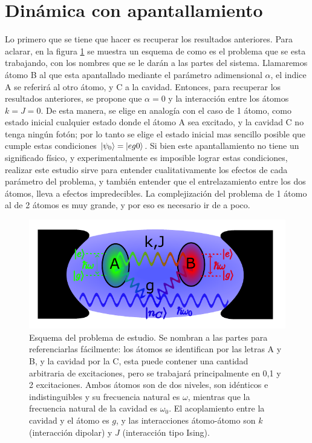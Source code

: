 \section{Dinámica con apantallamiento}
\label{sec4:dinamica apantallamiento}
Lo primero que se tiene que hacer es recuperar los resultados anteriores. Para aclarar, en la figura \ref{fig4:diagrama esquematico} se muestra un esquema de como es el problema que se esta trabajando, con los nombres que se le darán a las partes del sistema. Llamaremos átomo B al que esta apantallado mediante el parámetro adimensional $\alpha$, el indice A se referirá al otro átomo, y C a la cavidad. Entonces, para recuperar los resultados anteriores, se propone que $\alpha=0$ y la interacción entre los átomos $k=J=0$. De esta manera, se elige en analogía con el caso de 1 átomo, como estado inicial cualquier estado donde el átomo A sea excitado, y la cavidad C no tenga ningún fotón; por lo tanto se elige el estado inicial mas sencillo posible que cumple estas condiciones $\ket{\psi_0}=\ket{eg0}$. Si bien este apantallamiento no tiene un significado físico, y experimentalmente es imposible lograr estas condiciones, realizar este estudio sirve para entender cualitativamente los efectos de cada parámetro del problema, y también entender que el entrelazamiento entre los dos átomos, lleva a efectos impredecibles. La complejización del problema de 1 átomo al de 2 átomos es muy grande, y por eso es necesario ir de a poco.
\begin{figure}[H]
    \centering
    \includegraphics[width=\textwidth]{figuras/ch4/esquema.pdf}
    \caption{Esquema del problema de estudio. Se nombran a las partes para referenciarlas fácilmente: los átomos se identifican por las letras A y B, y la cavidad por la C, esta puede contener una cantidad arbitraria de excitaciones, pero se trabajará principalmente en 0,1 y 2 excitaciones. Ambos átomos son de dos niveles, son idénticos e indistinguibles y su frecuencia natural es $\omega$, mientras que la frecuencia natural de la cavidad es $\omega_0$. El acoplamiento entre la cavidad y el átomo es $g$, y las interacciones átomo-átomo son $k$ (interacción dipolar) y $J$ (interacción tipo Ising).}
    \label{fig4:diagrama esquematico}
\end{figure}
